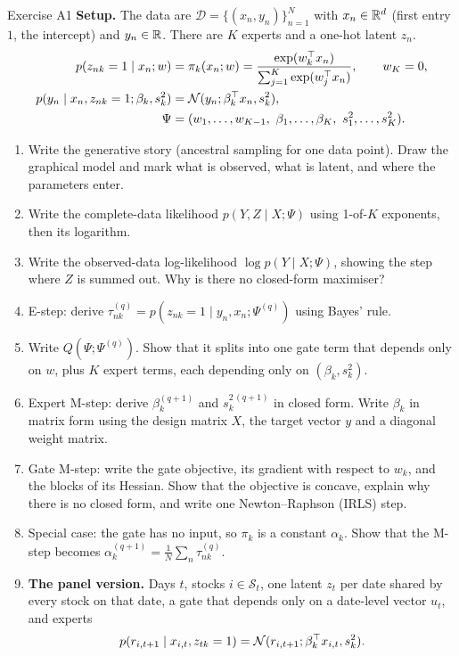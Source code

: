 \begin{exercise}{Exercise A1}
\textbf{Setup.} The data are $\mathcal D=\{(x_n,y_n)\}_{n=1}^N$ with $x_n\in\mathbb{R}^d$ (first entry $1$, the intercept) and $y_n\in\mathbb{R}$. There are $K$ experts and a one-hot latent $z_n$.
\begin{align*}
p(z_{nk}=1\mid x_n;w)&=\pi_k(x_n;w)=\frac{\exp(w_k\T x_n)}{\sum_{j=1}^K\exp(w_j\T x_n)},\qquad w_K=0,\\
p(y_n\mid x_n,z_{nk}=1;\beta_k,s_k^2)&=\N(y_n;\beta_k\T x_n,s_k^2),\\
\Psi&=(w_1,\dots,w_{K-1},\ \beta_1,\dots,\beta_K,\ s_1^2,\dots,s_K^2).
\end{align*}
\begin{enumerate}[label=(\alph*)]
\item Write the generative story (ancestral sampling for one data point). Draw the graphical model and mark what is observed, what is latent, and where the parameters enter.
\item Write the complete-data likelihood $p(Y,Z\mid X;\Psi)$ using 1-of-$K$ exponents, then its logarithm.
\item Write the observed-data log-likelihood $\log p(Y\mid X;\Psi)$, showing the step where $Z$ is summed out. Why is there no closed-form maximiser?
\item E-step: derive $\tau_{nk}^{(q)}=p(z_{nk}=1\mid y_n,x_n;\Psi^{(q)})$ using Bayes' rule.
\item Write $Q(\Psi;\Psi^{(q)})$. Show that it splits into one gate term that depends only on $w$, plus $K$ expert terms, each depending only on $(\beta_k,s_k^2)$.
\item Expert M-step: derive $\beta_k^{(q+1)}$ and $s_k^{2\,(q+1)}$ in closed form. Write $\beta_k$ in matrix form using the design matrix $X$, the target vector $y$ and a diagonal weight matrix.
\item Gate M-step: write the gate objective, its gradient with respect to $w_k$, and the blocks of its Hessian. Show that the objective is concave, explain why there is no closed form, and write one Newton--Raphson (IRLS) step.
\item Special case: the gate has no input, so $\pi_k$ is a constant $\alpha_k$. Show that the M-step becomes $\alpha_k^{(q+1)}=\frac1N\sum_n\tau_{nk}^{(q)}$.
\item \textbf{The panel version.} Days $t$, stocks $i\in\mathcal S_t$, one latent $z_t$ per date shared by every stock on that date, a gate that depends only on a date-level vector $u_t$, and experts
\[
p(r_{i,t+1}\mid x_{i,t},z_{tk}=1)=\mathcal{N}(r_{i,t+1};\beta_k^{\top} x_{i,t},s_k^2).
\]
\end{enumerate}
\end{exercise}
